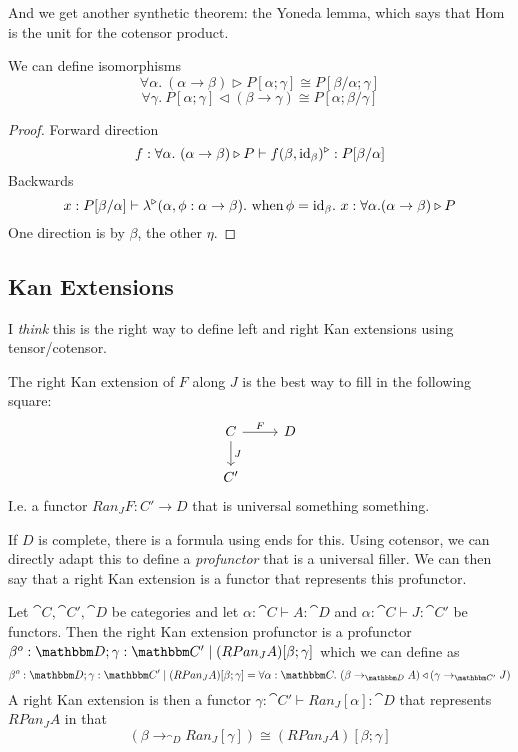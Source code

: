 \documentclass{article}
\begin{document}
And we get another synthetic theorem: the Yoneda lemma, which says
that Hom is the unit for the cotensor product.
\begin{lemma}
  We can define isomorphisms
  \[ \forall \alpha.~ (\alpha \to \beta) \triangleright P[\alpha;\gamma] \cong P[\beta/\alpha;\gamma] \]
  \[ \forall \gamma.~ P[\alpha;\gamma] \triangleleft (\beta \to \gamma) \cong P[\alpha;\beta/\gamma]\]
\end{lemma}
\begin{proof}
  Forward direction
  \[ f : \forall \alpha.~(\alpha\to\beta)\triangleright P \vdash
  f(\beta,\text{id}_{\beta})^\triangleright : P[\beta/\alpha]
  \]
  Backwards
  \[ x : P[\beta/\alpha]\vdash
  \lambda^\triangleright(\alpha,\phi : \alpha \to \beta).~\text{when}\, \phi = \text{id}_{\beta}.~ x : \forall \alpha. (\alpha\to \beta) \triangleright P
  \]
  One direction is by $\beta$, the other $\eta$.
\end{proof}


\subsection{Kan Extensions}

I \emph{think} this is the right way to define left and right Kan
extensions using tensor/cotensor.

The right Kan extension of $F$ along $J$ is the best way to fill in the following square:
\[%
\begin{tikzcd}
C \arrow[d, "J"] \arrow[r, "F"] & D \\
C'                              &  
\end{tikzcd}\]
I.e. a functor $Ran_J F : C' \to D$ that is universal something something.

If $D$ is complete, there is a formula using ends for this. Using
cotensor, we can directly adapt this to define a \emph{profunctor}
that is a universal filler. We can then say that a right Kan extension
is a functor that represents this profunctor.

\begin{definition}
  Let $\cat C, \cat C', \cat D$ be categories and let $\alpha : \cat C
  \vdash A : \cat D$ and $\alpha : \cat C \vdash J : \cat C'$ be
  functors. Then the right Kan extension profunctor is a profunctor
  $\beta^o:\cat D; \gamma:\cat C' \pipe (RPan_J A)[\beta;\gamma]$ which we can define as
  \[ \beta^o:\cat D; \gamma:\cat C' \pipe (RPan_J A)[\beta;\gamma] = \forall \alpha:\cat C.~ (\beta \to_{\cat D} A) \triangleleft (\gamma \to_{\cat C'} J)
  \]
  A right Kan extension is then a functor $\gamma:\cat C' \vdash
  Ran_J[\alpha] : \cat D$ that represents $RPan_J A$ in that
  \[ (\beta \to_{\cat D} Ran_J[\gamma]) \cong (RPan_J A)[\beta;\gamma] \]
\end{definition}
\end{document}
